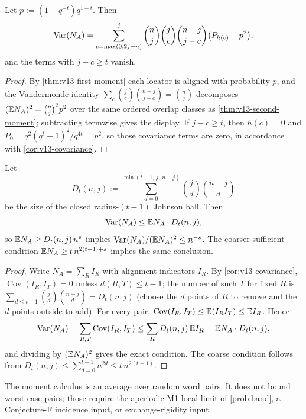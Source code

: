 \begin{corollary}\label{cor:v13-exact-variance}
Let $p:=(1-q^{-t})q^{1-t}$.  Then
\[
\operatorname{Var}(N_A)=
\sum_{c=\max(0,2j-n)}^{j}
\binom{n}{j}\binom{j}{c}\binom{n-j}{j-c}
\bigl(P_{h(c)}-p^2\bigr),
\]
and the terms with $j-c\ge t$ vanish.
\end{corollary}

\begin{proof}
By \cref{thm:v13-first-moment} each locator is aligned with probability $p$, and the Vandermonde identity $\sum_c\binom jc\binom{n-j}{j-c}=\binom nj$ decomposes $(\mathbb E N_A)^2=\binom nj^2p^2$ over the same ordered overlap classes as \cref{thm:v13-second-moment}; subtracting termwise gives the display.  If $j-c\ge t$, then $h(c)=0$ and $P_0=q^2(q^t-1)^2/q^{4t}=p^2$, so those covariance terms are zero, in accordance with \cref{cor:v13-covariance}.
\end{proof}

\begin{corollary}\label{cor:v13-dependency}
Let
\[
        D_t(n,j):=
        \sum_{d=0}^{\min(t-1,\,j,\,n-j)}
        \binom jd\binom{n-j}{d}
\]
be the size of the closed radius-$(t-1)$ Johnson ball.  Then
\[
        \operatorname{Var}(N_A)\le \mathbb E N_A\cdot D_t(n,j),
\]
so $\mathbb E N_A\ge D_t(n,j)\,n^s$ implies $\operatorname{Var}(N_A)/(\mathbb E N_A)^2\le n^{-s}$.  The coarser sufficient condition $\mathbb E N_A\ge t\,n^{2(t-1)+s}$ implies the same conclusion.
\end{corollary}

\begin{proof}
Write $N_A=\sum_RI_R$ with alignment indicators $I_R$.  By \cref{cor:v13-covariance}, $\operatorname{Cov}(I_R,I_T)=0$ unless $d(R,T)\le t-1$; the number of such $T$ for fixed $R$ is $\sum_{d\le t-1}\binom jd\binom{n-j}d=D_t(n,j)$ \textup(choose the $d$ points of $R$ to remove and the $d$ points outside to add\textup).  For every pair, $\operatorname{Cov}(I_R,I_T)\le\mathbb E(I_RI_T)\le\mathbb E I_R$.  Hence
\[
        \operatorname{Var}(N_A)=\sum_{R,T}\operatorname{Cov}(I_R,I_T)
        \le \sum_R D_t(n,j)\,\mathbb E I_R
        =\mathbb E N_A\cdot D_t(n,j),
\]
and dividing by $(\mathbb E N_A)^2$ gives the exact condition.  The coarse condition follows from $D_t(n,j)\le\sum_{d=0}^{t-1}n^{2d}\le t\,n^{2(t-1)}$.
\end{proof}

\begin{remark}\label{rem:v13-moment-scope}
The moment calculus is an average over random word pairs.  It does not bound worst-case pairs; those require the aperiodic M1 local limit of \cref{prob:band}, a Conjecture-F incidence input, or exchange-rigidity input.
\end{remark}

